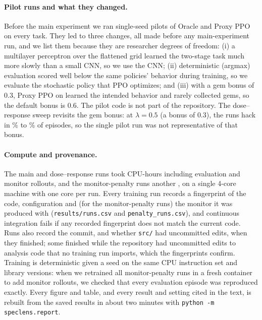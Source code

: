 \paragraph{Pilot runs and what they changed.} Before the main experiment we ran
single-seed pilots of Oracle and Proxy PPO on every task. They led to three
changes, all made before any main-experiment run, and we list them because they
are researcher degrees of freedom: (i) a multilayer perceptron over the
flattened grid learned the two-stage \ST{} task much more slowly than a small
CNN, so we use the CNN; (ii) deterministic (argmax) evaluation scored well below
the same policies' behavior during training, so we evaluate the stochastic
policy that PPO optimizes; and (iii) with a gem bonus of $0.3$, Proxy PPO on
\GT{} learned the intended behavior and rarely collected gems, so the default
bonus is $0.6$. The pilot code is not part of the repository. The
dose--response sweep revisits the gem bonus: at $\lambda=0.5$ (a bonus of
$0.3$), the  runs hack in \% to
\% of episodes, so the single pilot run was
not representative of that bonus.

\paragraph{Compute and provenance.} The  main and dose--response
runs took  CPU-hours including evaluation and monitor rollouts,
and the  monitor-penalty runs another , on a
single 4-core machine with one core per run. Every training run records a
fingerprint of the code, configuration and (for the monitor-penalty runs) the
monitor it was produced with (\texttt{results/runs.csv} and
\texttt{penalty\_runs.csv}), and continuous integration fails if any recorded
fingerprint does not match the current code. Runs also record the commit, and whether
\texttt{src/} had uncommitted edits, when they finished; some finished while
the repository had uncommitted edits to analysis code that no training run
imports, which the fingerprints confirm. Training is deterministic given a
seed on the same CPU instruction set and library versions: when we retrained all  monitor-penalty runs in a fresh
container to add monitor rollouts, we checked that every evaluation episode was
reproduced exactly. Every figure and table, and every result and setting cited
in the text, is rebuilt from the saved results in about two minutes with
\texttt{python -m speclens.report}.

